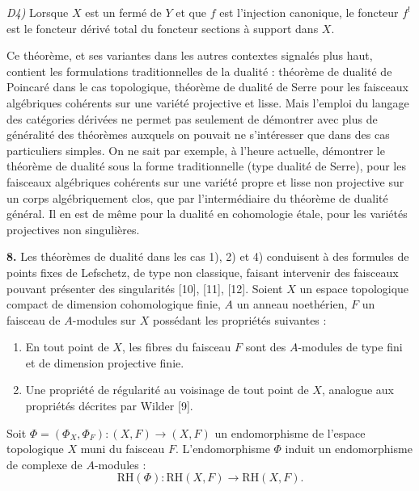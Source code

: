 %
\noindent\textit{D4)} Lorsque $X$ est un fermé de $Y$ et que $f$ est
l'injection canonique, le foncteur $f^!$ est le foncteur dérivé total du
foncteur \og sections à support dans $X$\fg{}.

Ce théorème, et ses variantes dans les autres contextes signalés plus haut,
contient les formulations traditionnelles de la dualité : théorème de
dualité de Poincaré dans le cas topologique, théorème de dualité de Serre pour
les faisceaux algébriques cohérents sur une variété projective et lisse. Mais
l'emploi du langage des catégories dérivées ne permet pas seulement de
démontrer avec plus de généralité des théorèmes auxquels on pouvait ne
s'intéresser que dans des cas particuliers simples. On ne sait par exemple,
à l'heure actuelle, démontrer le théorème de dualité sous la forme
traditionnelle (type dualité de Serre), pour les faisceaux algébriques
cohérents sur une variété propre et lisse non projective sur un corps
algébriquement clos, que par l'intermédiaire du théorème de dualité général.
Il en est de même pour la dualité en cohomologie étale, pour les variétés
projectives non singulières.

\noindent\textbf{8.}\quad
Les théorèmes de dualité dans les cas 1), 2) et 4) conduisent à des formules
de points fixes de Lefschetz, de type non classique, faisant intervenir des
faisceaux pouvant présenter des singularités [10], [11], [12]. Soient $X$ un
espace topologique compact de dimension cohomologique finie, $A$ un anneau
noethérien, $F$ un faisceau de $A$-modules sur $X$ possédant les propriétés
suivantes :

\begin{enumerate}
\renewcommand{\labelenumi}{\alph{enumi})}
\item En tout point de $X$, les fibres du faisceau $F$ sont des $A$-modules
de type fini et de dimension projective finie.

\item Une propriété de régularité au voisinage de tout point de $X$, analogue
aux propriétés décrites par Wilder [9].
\end{enumerate}

Soit $\Phi=(\Phi_X,\Phi_F)\colon(X,F)\longrightarrow(X,F)$ un endomorphisme
de l'espace topologique $X$ muni du faisceau $F$. L'endomorphisme $\Phi$
induit un endomorphisme de complexe de $A$-modules :
\[
\mathrm{RH}(\Phi)\colon
\mathrm{RH}(X,F)\longrightarrow\mathrm{RH}(X,F).
\]

